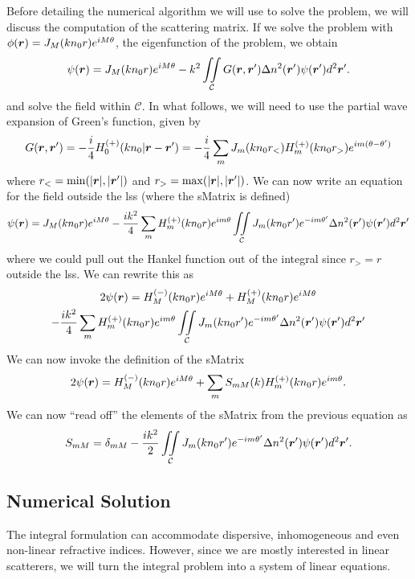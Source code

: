 Before detailing the numerical algorithm we will use to solve the problem, 
we will discuss the computation of the scattering matrix. 
If we solve the problem with $\phi(\boldsymbol{r}) = J_M(kn_0r)e^{iM\theta}$, 
the eigenfunction of the problem, we obtain
	\begin{equation}
		\psi(\boldsymbol{r}) = J_M(kn_0r)e^{iM\theta} -k^2\mathop{\iint}_\mathcal{C}G(\boldsymbol{r},\boldsymbol{r}')\Delta n^2(\boldsymbol{r}')\psi(\boldsymbol{r}')d^2\boldsymbol{r}'.
	\end{equation}
and solve the field within $\mathcal{C}$. In what follows, we will
need to use the partial wave expansion of Green's function, given by
\cite{ECO2006}
	\begin{equation}
		G(\boldsymbol{r},\boldsymbol{r}') = -\frac{i}{4}H_0^{(+)}(kn_0|\boldsymbol{r}-\boldsymbol{r}') = -\frac{i}{4}\sum_m J_m(kn_0r_<)H_m^{(+)}(kn_0r_>)e^{im(\theta-\theta')}
	\end{equation}
where $r_<=\min(|\boldsymbol{r}|,|\boldsymbol{r}'|)$ and $r_>=\max(|\boldsymbol{r}|,|\boldsymbol{r}'|)$.
We can now write an equation for the field outside the \gls{lss} (where
the \gls{sMatrix} is defined)
	\begin{equation}
			\psi(\boldsymbol{r}) = J_M(kn_0r)e^{iM\theta}
						-\frac{ik^2}{4}\sum_m H_m^{(+)}(kn_0r)e^{im\theta}
						\mathop{\iint}_\mathcal{C} J_m(kn_0r')e^{-im\theta'}\Delta n^2(\boldsymbol{r}')\psi(\boldsymbol{r}')d^2\boldsymbol{r}'
	\end{equation}
where we could pull out the Hankel function out of the integral since
$r_>=r$ outside the \gls{lss}. We can rewrite this as
	\begin{multline}
		2\psi(\boldsymbol{r}) = H_M^{(-)}(kn_0r)e^{iM\theta}+H_M^{(+)}(kn_0r)e^{iM\theta} \\
						-\frac{ik^2}{4}\sum_m H_m^{(+)}(kn_0r)e^{im\theta}
						\mathop{\iint}_\mathcal{C} J_m(kn_0r')e^{-im\theta'}\Delta n^2(\boldsymbol{r}')\psi(\boldsymbol{r}')d^2\boldsymbol{r}'
	\end{multline}
We can now invoke the definition of the \gls{sMatrix}
	\begin{equation}
		2\psi(\boldsymbol{r}) = H_M^{(-)}(kn_0r)e^{iM\theta}+\sum_m S_{mM}(k)H_m^{(+)}(kn_0r)e^{im\theta}.
	\end{equation}
We can now ``read off'' the elements of the \gls{sMatrix}
from the previous equation as
	\begin{equation}
		S_{mM} = \delta_{mM}-\frac{ik^2}{2}\mathop{\iint}_\mathcal{C}J_m(kn_0r')e^{-im\theta'}\Delta n^2(\boldsymbol{r}')\psi(\boldsymbol{r}')d^2\boldsymbol{r}'.
	\end{equation}

\subsection{Numerical Solution}
The integral formulation can accommodate dispersive, inhomogeneous and even non-linear refractive indices. 
However, since we are mostly interested in linear scatterers, we will turn the integral problem
into a system of linear equations. 

